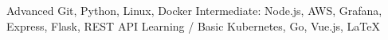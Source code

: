 

\begin{cvskills}

  \cvskill
    {Advanced} %
    {Git, Python, Linux, Docker} %
  \cvskill
    {Intermediate:} %
    {Node.js, AWS, Grafana, Express, Flask, REST API} %
  \cvskill
    {Learning / Basic} %
    {Kubernetes, Go, Vue.js, LaTeX} %


\end{cvskills}
